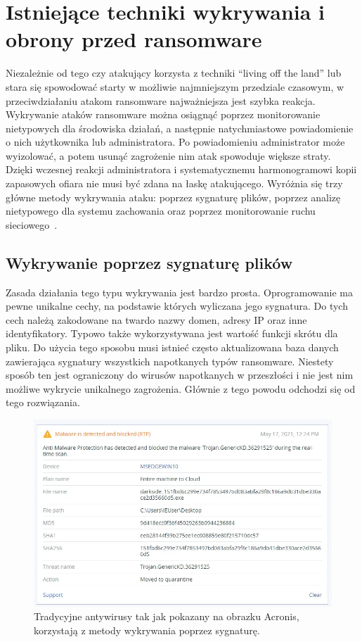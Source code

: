 \section{Istniejące techniki wykrywania i obrony przed ransomware}
Niezależnie od tego czy atakujący korzysta z techniki \foreignquote{english}{living off the land} lub stara się spowodować starty w możliwie najmniejszym przedziale czasowym, w przeciwdziałaniu atakom ransomware najważniejsza jest szybka reakcja. Wykrywanie ataków ransomware można osiągnąć poprzez monitorowanie nietypowych dla środowiska działań, a następnie natychmiastowe powiadomienie o nich użytkownika lub administratora. Po powiadomieniu administrator może wyizolować, a potem usunąć zagrożenie nim atak spowoduje większe straty. Dzięki wczesnej reakcji administratora i systematycznemu harmonogramowi kopii zapasowych ofiara nie musi być zdana na łaskę atakującego.
\newline
Wyróżnia się trzy główne metody wykrywania ataku: poprzez sygnaturę plików, poprzez analizę nietypowego dla systemu zachowania oraz poprzez monitorowanie ruchu sieciowego~\cite{vehabovic_ransomware_2022}.
\subsection{Wykrywanie poprzez sygnaturę plików}
Zasada działania tego typu wykrywania jest bardzo prosta. Oprogramowanie ma pewne unikalne cechy, na podstawie których wyliczana jego sygnatura. Do tych cech należą zakodowane na twardo nazwy domen, adresy IP oraz inne identyfikatory. Typowo także wykorzystywana jest wartość funkcji skrótu dla pliku. Do użycia tego sposobu musi istnieć często aktualizowana baza danych zawierająca sygnatury wszystkich napotkanych typów ransomware. Niestety sposób ten jest ograniczony do wirusów napotkanych w przeszłości i nie jest nim możliwe wykrycie unikalnego zagrożenia. Głównie z tego powodu odchodzi się od tego rozwiązania.
\begin{figure}[H]
    \centering
    \includegraphics[width=0.75\linewidth]{rysunki/sygnatura.png}
    \caption{Tradycyjne antywirusy tak jak pokazany na obrazku Acronis, korzystają z metody wykrywania poprzez sygnaturę.}
    \label{fig:enter-label}
\end{figure}
